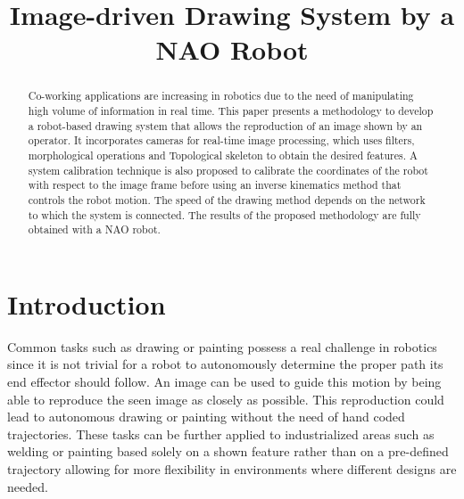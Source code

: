 \documentclass[conference]{IEEEtran}
\begin{document}
\title{Image-driven Drawing System by a NAO Robot}
\author{
}
\maketitle
\begin{abstract}
Co-working applications are increasing in robotics due to the need of manipulating high volume of information in real time. This paper presents a methodology to develop a robot-based drawing system that allows the reproduction of an image shown by an operator. It incorporates cameras for real-time image processing, which uses filters, morphological operations and Topological skeleton to obtain the desired features. A system calibration technique is also proposed to calibrate the coordinates of the robot with respect to the image frame before using an inverse kinematics method that controls the robot motion. The speed of the drawing method depends on the network to which the system is connected. The results of the proposed methodology are fully obtained with a NAO robot.
\end{abstract}
\IEEEpeerreviewmaketitle

\section{Introduction}

Common tasks such as drawing or painting possess a real challenge in robotics since it is not trivial for a robot to autonomously determine the proper path its end effector should follow. An image can be used to guide this motion by being able to reproduce the seen image as closely as possible. This reproduction could lead to autonomous drawing or painting without the need of hand coded trajectories. These tasks can be further applied to industrialized areas such as welding or painting based solely on a shown feature rather than on a pre-defined trajectory allowing for more flexibility in environments where different designs are needed.
\end{document}
